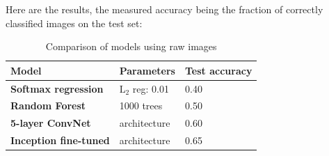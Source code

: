 Here are the results, the measured accuracy being the fraction of correctly classified images on the test set:
\begin{table}[H]
\begin{center}
    \begin{tabular}{| l | l | p{5cm} |}
    \hline
    Model & Parameters & Test accuracy \\ \hline
    \textbf{Softmax regression} & $\text{L}_2$ reg: 0.01 & 0.40  \\ \hline
    \textbf{Random Forest} & 1000 trees & 0.50 \\ \hline
    \textbf{5-layer ConvNet} & architecture & 0.60 \\ \hline
    \textbf{Inception fine-tuned} & architecture & 0.65 \\
    \hline
    \end{tabular}
\end{center} 
\caption{Comparison of models using raw images}
\end{table}





